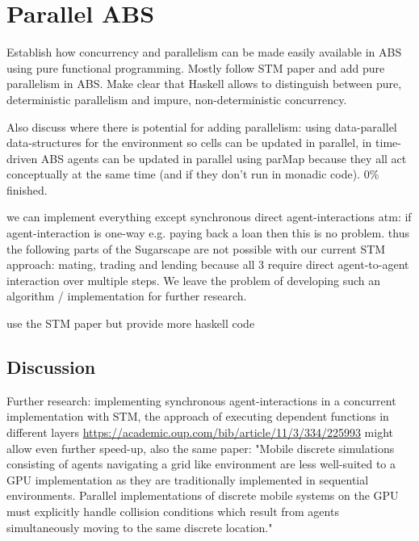 \chapter{Parallel ABS}
\label{ch:parallel_abs}

Establish how concurrency and parallelism can be made easily available in ABS using pure functional programming. Mostly follow STM paper and add pure parallelism in ABS. Make clear that Haskell allows to distinguish between pure, deterministic parallelism and impure, non-deterministic concurrency.

Also discuss where there is potential for adding parallelism: using data-parallel data-structures for the environment so cells can be updated in parallel, in time-driven ABS agents can be updated in parallel using parMap because they all act conceptually at the same time (and if they don't run in monadic code). 0\% finished.

we can implement everything except synchronous direct agent-interactions atm: if agent-interaction is one-way e.g. paying back a loan then this is no problem. thus the following parts of the Sugarscape are not possible with our current STM approach: mating, trading and lending  because all 3 require direct agent-to-agent interaction over multiple steps. We leave the problem of developing such an algorithm / implementation for further research.

use the STM paper but provide more haskell code



\section{Discussion}
Further research: implementing synchronous agent-interactions in a concurrent implementation with STM, the approach of executing dependent functions in different layers \url{https://academic.oup.com/bib/article/11/3/334/225993} might allow even further speed-up, also the same paper: "Mobile discrete simulations consisting of agents navigating a grid like environment are less well-suited to a GPU implementation as they are traditionally implemented in sequential environments. Parallel implementations of discrete mobile systems on the GPU must explicitly handle collision conditions which result from agents simultaneously moving to the same discrete location."